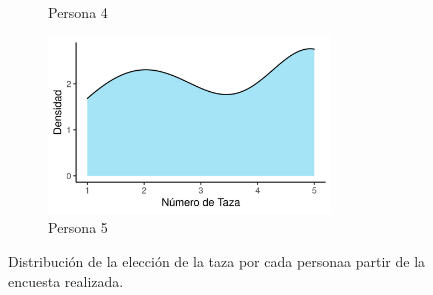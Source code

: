 \begin{figure}[H]
\begin{subfigure}[b]{8cm}
        \caption{Persona 4}
    \end{subfigure}
    \begin{subfigure}[b]{8cm}
        \includegraphics[width=7.5cm]{Graphics/problema06_5.png}
        \caption{Persona 5}
    \end{subfigure}
    \caption{Distribución de la elección de la taza por cada personaa partir de la encuesta realizada.}
\end{figure}
